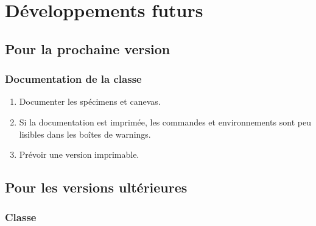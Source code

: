 \chapter{Développements futurs}\label{cha-devel-futurs}

\section{Pour la prochaine version}
\label{sec-pour-la-prochaine}

%

\subsection{Documentation de la classe}
\label{sec-documentation-de-la}

\begin{enumerate}
\item Documenter les spécimens et canevas.
\item Si la documentation est imprimée, les commandes et environnements sont peu
  lisibles dans les boîtes de warnings.
\item Prévoir une version imprimable.
\end{enumerate}

\section{Pour les versions ultérieures}
\label{sec-pour-les-versions}

\subsection{Classe}
\label{sec-classe-ult}


